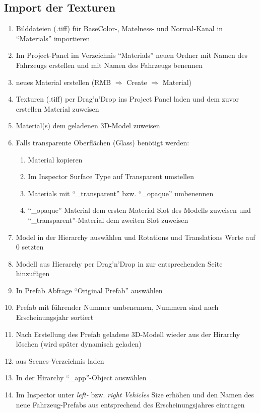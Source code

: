 \subsection{Import der Texturen}
%
\begin{enumerate}
	\item Bilddateien (.tiff) für BaseColor-, Matelness- und Normal-Kanal in \enquote{Materials} importieren
	\item Im Project-Panel im Verzeichnis \enquote{Materials} neuen Ordner mit Namen des Fahrzeugs erstellen und mit Namen des Fahrzeugs benennen
	\item neues Material erstellen (RMB $\Rightarrow$ Create $\Rightarrow$ Material)
	\item Texturen (.tiff) per Drag'n'Drop ins Project Panel laden und dem zuvor erstellen Material zuweisen
	\item Material(s) dem geladenen 3D-Model zuweisen 
	\item Falls transparente Oberflächen (Glass) benötigt werden:
	\begin{enumerate}
		\item Material kopieren
		\item Im Inspector Surface Type auf Transparent umstellen
		\item Materials mit \enquote{\_transparent} bzw. \enquote{\_opaque} umbenennen
		\item \enquote{\_opaque}-Material dem ersten Material Slot des Modells zuweisen und \enquote{\_transparent}-Material dem zweiten Slot zuweisen
	\end{enumerate}
	\item Model in der Hierarchy auswählen und Rotations und Translations Werte auf 0 setzten
	\item Modell aus Hierarchy per Drag'n'Drop in  zur entsprechenden Seite hinzufügen
	\item In Prefab Abfrage \enquote{Original Prefab} auswählen
	\item Prefab mit führender Nummer umbenennen, Nummern sind nach Erscheinungsjahr sortiert
	\item Nach Erstellung des Prefab geladene 3D-Modell wieder aus der Hirarchy löschen (wird später dynamisch geladen)
	\item \pres aus Scenes-Verzeichnis laden
	\item In der Hirarchy \enquote{\_app}-Object auswählen
	\item Im Inspector unter \emph{left-} bzw. \emph{right Vehicles} Size erhöhen und den Namen des neue Fahrzeug-Prefabs aus  entsprechend des Erscheinungsjahres eintragen 
\end{enumerate}
%
\newpage
